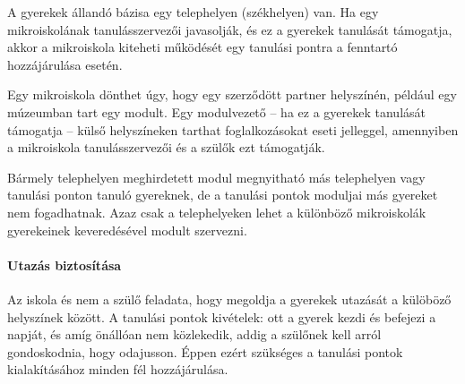 \begin{table}[h]
    \begin{center}
    \end{center}
    \label{tbl:tanulasi-helyek}
    \caption{Az iskolai tanulás különböző helyszínei.}
\end{table}

A gyerekek állandó bázisa egy telephelyen (székhelyen) van. Ha egy mikroiskolának tanulásszervezői javasolják, és ez a gyerekek tanulását támogatja, akkor a mikroiskola kiteheti működését egy tanulási pontra a fenntartó hozzájárulása esetén.

Egy mikroiskola dönthet úgy, hogy egy szerződött partner helyszínén, például egy múzeumban tart egy modult. Egy modulvezető -- ha ez a gyerekek tanulását támogatja --  külső helyszíneken tarthat foglalkozásokat eseti jelleggel, amennyiben a mikroiskola tanulásszervezői és a szülők ezt támogatják.

Bármely telephelyen meghirdetett modul megnyitható más telephelyen  vagy tanulási ponton tanuló gyereknek, de a tanulási pontok moduljai más gyereket nem fogadhatnak. Azaz csak a telephelyeken lehet a különböző mikroiskolák gyerekeinek keveredésével modult szervezni.

\paragraph{Utazás biztosítása} Az iskola és nem a szülő feladata, hogy megoldja a gyerekek utazását a külöböző helyszínek között. A tanulási pontok kivételek: ott a gyerek kezdi és befejezi a napját, és amíg önállóan nem közlekedik, addig a szülőnek kell arról gondoskodnia, hogy odajusson. Éppen ezért szükséges a tanulási pontok kialakításához minden fél hozzájárulása.


